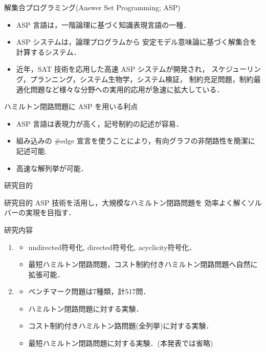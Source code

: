 \documentclass[dvipdfmx,10pt]{beamer}
\begin{document}
\begin{frame}{解集合プログラミング(Answer Set Programming; ASP)}
  \begin{itemize}
  \item \alert{ASP 言語}は，一階論理に基づく知識表現言語の一種．
  \item \alert{ASP システム}は，論理プログラムから
    安定モデル意味論に基づく解集合を計算するシステム．
  \item 近年，SAT 技術を応用した高速 ASP システムが開発され，
    スケジューリング，プランニング，システム生物学，システム検証，
    制約充足問題，制約最適化問題など様々な分野への実用的応用が急速に拡大している．
  \end{itemize}

  \begin{alertblock}{ハミルトン閉路問題に ASP を用いる利点}
    \begin{itemize}
    \item ASP 言語は表現力が高く，記号制約の記述が容易．
    \item 組み込みの \#edge 宣言を使うことにより，有向グラフの非閉路性を簡潔に記述可能.
    \item 高速な解列挙が可能．
    \end{itemize}
  \end{alertblock}
\end{frame}

\begin{frame}{研究目的}
  \begin{alertblock}{研究目的}
  ASP 技術を活用し，大規模なハミルトン閉路問題を
    効率よく解くソルバーの実現を目指す．
  \end{alertblock}
  \begin{block}{研究内容}
    \begin{enumerate}
    \item {}
      \begin{itemize}
      \item \textsf{undirected}符号化, \textsf{directed}符号化, \textsf{acyclicity}符号化．
      \item 最短ハミルトン閉路問題，コスト制約付きハミルトン閉路問題へ自然に拡張可能．
      \end{itemize}
    \item {}
      \begin{itemize}
      \item ベンチマーク問題は7種類，計517問．
      \item \alert{ハミルトン閉路問題に対する実験．}
      \item \alert{コスト制約付きハミルトン路問題(全列挙)に対する実験．}
      \item 最短ハミルトン閉路問題に対する実験．(本発表では省略)
      \end{itemize}
    \end{enumerate}
  \end{block}
\end{frame}
\end{document}
